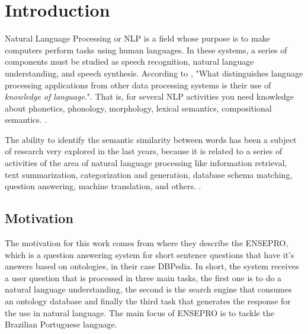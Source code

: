 \section{Introduction}\label{chap:intro}


Natural Language Processing or NLP is a field whose purpose is to make computers perform tasks using human languages. In these systems, a series of components must be studied as speech recognition, natural language understanding, and speech synthesis. According to , "What distinguishes language processing applications from other data processing systems is their use of \textit{knowledge of language}.". That is, for several NLP activities you need knowledge about phonetics, phonology, morphology, lexical semantics, compositional semantics. \cite{Jurafsky:2009:SLP:1214993}.

The ability to identify the semantic similarity between words has been a subject of research very explored in the last years, because it is related to a series of activities of the area of natural language processing like information retrieval, text summarization, categorization and generation, database schema matching, question answering, machine translation, and others. \cite{Islam2007ApplicationsOC, Jurafsky:2009:SLP:1214993}. 

\subsection{Motivation} 

% 

The motivation for this work comes from  where they describe the ENSEPRO, which is a question answering system for short sentence questions that have it's answers based on ontologies, in their case DBPedia. In short, the system receives a user question that is processed in three main tasks, the first one is to do a natural language understanding, the second is the search engine that consumes an ontology database and finally the third task that generates the response for the use in natural language. The main focus of ENSEPRO is to tackle the Brazilian Portuguese language. 

